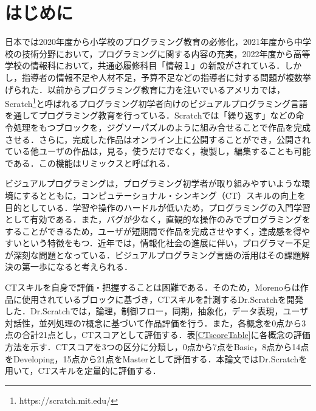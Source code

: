 \documentclass[submit,techrep,noauthor]{ipsj}
\begin{document}
\section{はじめに}

日本では2020年度から小学校のプログラミング教育の必修化，2021年度から中学校の技術分野において，プログラミングに関する内容の充実，2022年度から高等学校の情報科において，共通必履修科目「情報１」の新設がされている\cite{monkashou}．しかし，指導者の情報不足や人材不足，予算不足などの指導者に対する問題が複数挙げられた\cite{monkashou2}．以前からプログラミング教育に力を注いでいるアメリカでは，Scratch\footnote{https://scratch.mit.edu/}\cite{resnick2009scratch}と呼ばれるプログラミング初学者向けのビジュアルプログラミング言語を通してプログラミング教育を行っている．Scratchでは「繰り返す」などの命令処理をもつブロックを，ジグソーパズルのように組み合せることで作品を完成させる．さらに，完成した作品はオンライン上に公開することができ，公開されている他ユーザの作品は，見る，使うだけでなく，複製し，編集することも可能である．この機能はリミックスと呼ばれる．

ビジュアルプログラミングは，プログラミング初学者が取り組みやすいような環境にするとともに，コンピュテーショナル・シンキング（CT）\cite{wing2006computational}スキルの向上を目的としている．学習や操作のハードルが低いため，プログラミングの入門学習として有効である．また，バグが少なく，直観的な操作のみでプログラミングをすることができるため，ユーザが短期間で作品を完成させやすく，達成感を得やすいという特徴をもつ．近年では，情報化社会の進展に伴い，プログラマー不足が深刻な問題となっている．ビジュアルプログラミング言語の活用はその課題解決の第一歩になると考えられる．

CTスキルを自身で評価・把握することは困難である．そのため，Morenoらは作品に使用されているブロックに基づき，CTスキルを計測するDr.Scratch\cite{moreno2015dr}を開発した．Dr.Scratchでは，論理，制御フロー，同期，抽象化，データ表現，ユーザ対話性，並列処理の7概念に基づいて作品評価を行う．また，各概念を0点から3点の合計21点とし，CTスコアとして評価する．表\ref{CTscoreTable}に各概念の評価方法を示す．CTスコアを3つの区分に分類し，0点から7点をBasic，8点から14点をDeveloping，15点から21点をMasterとして評価する．本論文ではDr.Scratchを用いて，CTスキルを定量的に評価する．
\end{document}
